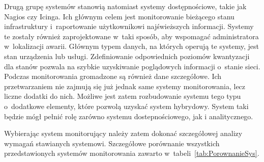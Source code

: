 Drugą grupę systemów stanowią natomiast systemy dostępnościowe, takie
jak Nagios czy Icinga. Ich głównym celem jest monitorowanie bieżącego
stanu infrastruktury i~raportowanie użytkownikowi najświeższych
informacji. Systemy te zostały również zaprojektowane w~taki sposób,
aby wspomagać administratora w~lokalizacji awarii. Głównym typem
danych, na których operują te systemy, jest stan urządzenia lub
usługi. Zdefiniowanie odpowiednich poziomów kwantyzacji dla stanów
pozwala na szybkie uzyskiwanie poglądowych informacji o~stanie
sieci. Podczas monitorowania gromadzone są również dane
szczegółowe. Ich przetwarzaniem nie zajmują się już jednak same
systemy monitorowania, lecz liczne dodatki do nich. Możliwe jest zatem
rozbudowanie systemu tego typu o~dodatkowe elementy, które pozwolą
uzyskać system hybrydowy. System taki będzie mógł pełnić rolę zarówno
systemu dostepnościowego, jak i analitycznego.

Wybierając system monitorujący należy zatem dokonać szczegółowej
analizy wymagań stawianych systemowi. Szczegółowe porównanie
wszystkich przedstawionych systemów monitorowania zawarto
w~tabeli~\ref{tab:PorownanieSys}.

